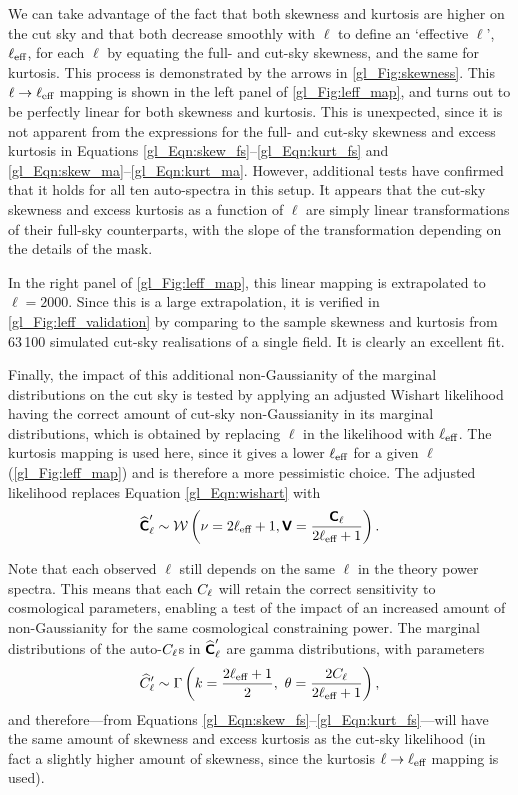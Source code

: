 We can take advantage of the fact that both skewness and kurtosis are higher on the cut sky and that both decrease smoothly with $\ell$ to define an `effective $\ell$', $\ell_\text{eff}$, for each $\ell$ by equating the full- and cut-sky skewness, and the same for kurtosis. This process is demonstrated by the arrows in \autoref{gl_Fig:skewness}. This $\ell \rightarrow \ell_\text{eff}$ mapping is shown in the left panel of \autoref{gl_Fig:leff_map}, and turns out to be perfectly linear for both skewness and kurtosis. This is unexpected, since it is not apparent from the expressions for the full- and cut-sky skewness and excess kurtosis in Equations \eqref{gl_Eqn:skew_fs}--\eqref{gl_Eqn:kurt_fs} and \eqref{gl_Eqn:skew_ma}--\eqref{gl_Eqn:kurt_ma}. However, additional tests have confirmed that it holds for all ten auto-spectra in this setup. It appears that the cut-sky skewness and excess kurtosis as a function of $\ell$ are simply linear transformations of their full-sky counterparts, with the slope of the transformation depending on the details of the mask.

In the right panel of \autoref{gl_Fig:leff_map}, this linear mapping is extrapolated to $\ell = 2000$. Since this is a large extrapolation, it is verified in \autoref{gl_Fig:leff_validation} by comparing to the sample skewness and kurtosis from 63\,100 simulated cut-sky realisations of a single field. It is clearly an excellent fit.

Finally, the impact of this additional non-Gaussianity of the marginal distributions on the cut sky is tested by applying an adjusted Wishart likelihood having the correct amount of cut-sky non-Gaussianity in its marginal distributions, which is obtained by replacing $\ell$ in the likelihood with $\ell_\text{eff}$. The kurtosis mapping is used here, since it gives a lower $\ell_\text{eff}$ for a given $\ell$ (\autoref{gl_Fig:leff_map}) and is therefore a more pessimistic choice. The adjusted likelihood replaces Equation \eqref{gl_Eqn:wishart} with
\begin{equation}
\widehat{\bm{\mathsf{C}}}'_\ell \sim
\mathcal{W} \left( \nu = 2 \ell_\text{eff} + 1,
\bm{\mathsf{V}} = \frac{\bm{\mathsf{C}}_\ell}{2 \ell_\text{eff} + 1} \right).
\label{gl_Eqn:adj_wishart}
\end{equation}

Note that each observed $\ell$ still depends on the same $\ell$ in the theory power spectra. This means that each $C_\ell$ will retain the correct sensitivity to cosmological parameters, enabling a test of the impact of an increased amount of non-Gaussianity for the same cosmological constraining power. The marginal distributions of the auto-$C_\ell$s in $\widehat{\bm{\mathsf{C}}}'_\ell$ are gamma distributions, with parameters
\begin{equation}
\widehat{C}'_\ell \sim \Gamma \left(
k = \frac{2 \ell_\text{eff} + 1}{2},~
\theta = \frac{2 C_\ell}{2 \ell_\text{eff} + 1} \right),
\end{equation}
and therefore---from Equations \eqref{gl_Eqn:skew_fs}--\eqref{gl_Eqn:kurt_fs}---will have the same amount of skewness and excess kurtosis as the cut-sky likelihood (in fact a slightly higher amount of skewness, since the kurtosis $\ell \rightarrow \ell_\text{eff}$ mapping is used).


